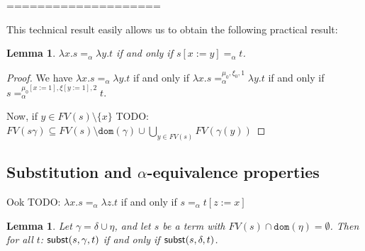\documentclass{lmcs}
\theoremstyle{theorem}\newtheorem{theorem}[dummy]{Theorem}
\theoremstyle{theorem}\newtheorem{lemma}[dummy]{Lemma}
\theoremstyle{theorem}\newtheorem{corollary}[dummy]{Corollary}
\theoremstyle{definition}\newtheorem{definition}[dummy]{Definition}
\theoremstyle{definition}\newtheorem{example}[dummy]{Example}
\newcommand{\FV}{\mathit{FV}}
\newcommand{\domain}{\mathtt{dom}}
\newcommand{\abs}[2]{\lambda #1.#2}
\begin{document}
====================



This technical result easily allows us to obtain the following practical result:

\begin{lemma}\label{lem:alphasubst}
$\abs{x}{s} =_\alpha \abs{y}{t}$ if and only if $s[x:=y] =_\alpha t$.
\end{lemma}

\begin{proof}
We have $\abs{x}{s} =_\alpha \abs{y}{t}$ if and only if
$\abs{x}{s} =_\alpha^{\mu_0,\xi_0,1} \abs{y}{t}$ if and only if
$s =_\alpha^{\mu_0[x:=1],\xi[y:=1],2} t$.

Now, if $y \in \FV(s) \setminus \{x\}$ TODO: $\FV(s\gamma) \subseteq \FV(s)\setminus
\domain(\gamma) \cup \bigcup_{y \in \FV(s)} \FV(\gamma(y))$
\end{proof}

\subsection{Substitution and $\alpha$-equivalence properties}


Ook TODO: $\abs{x}{s} =_\alpha \abs{z}{t}$ if and only if $s =_\alpha t[z:=x]$

\begin{lemma}\label{lem:unusedsubstitution}
Let $\gamma = \delta \cup \eta$, and let $s$ be a term with $\FV(s) \cap \domain(\eta) = \emptyset$.
Then for all $t$: $\mathsf{subst}(s,\gamma,t)$ if and only if $\mathsf{subst}(s,\delta,t)$.
\end{lemma}
\end{document}
